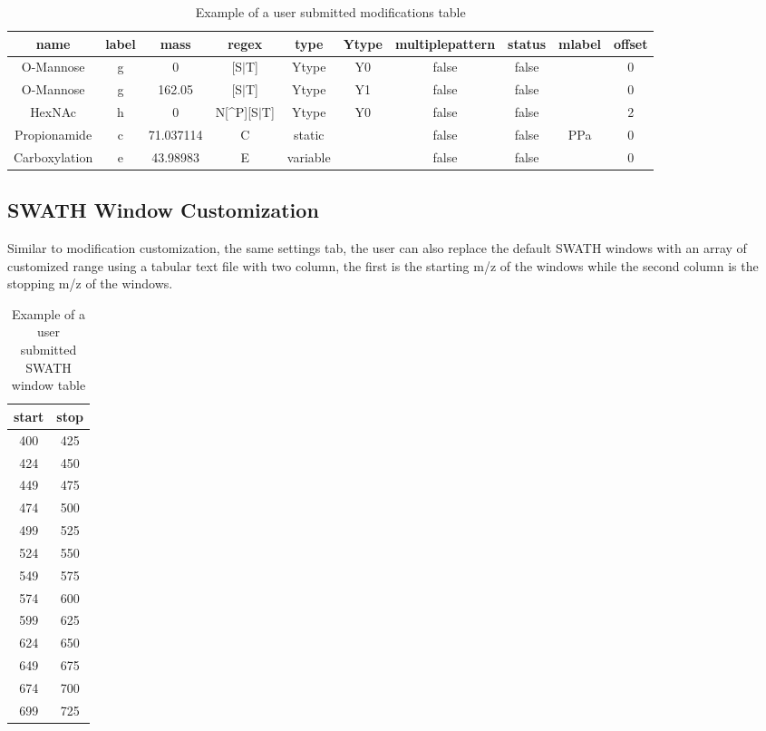 \documentclass[../manual.tex]{subfiles}
\begin{document}
\begin{table}[h]
	\caption{Example of a user submitted modifications table}
	\begin{adjustbox}{width=1\textwidth}
		\small
		\begin{tabular}{c c c c c c c c c c}
			\hline name   & label & mass      & regex           & type     & Ytype & multiplepattern & status & mlabel & offset \\ [0.1ex]
			\hline\hline
			O-Mannose     & g     & 0         & [S$|$T]         & Ytype    & Y0    & false           & false  &        & 0      \\
			O-Mannose     & g     & 162.05    & [S$|$T]         & Ytype    & Y1    & false           & false  &        & 0      \\
			HexNAc        & h     & 0         & N[\^{}P][S$|$T] & Ytype    & Y0    & false           & false  &        & 2      \\
			Propionamide  & c     & 71.037114 & C               & static   &       & false           & false  & PPa    & 0      \\
			Carboxylation & e     & 43.98983  & E               & variable &       & false           & false  &        & 0      \\
		\end{tabular}
	\end{adjustbox}
\end{table}

\subsection{SWATH Window Customization}
Similar to modification customization, the same settings tab, the user can also replace the default SWATH windows with an array of customized range using a tabular text file with two column, the first is the starting m/z of the windows while the second column is the stopping m/z of the windows.
\begin{table}[h]
	\caption{Example of a user submitted SWATH window table}
	\centering
	\begin{tabular}{c c}
		\hline start & stop \\
		\hline\hline
		400          & 425  \\
		424          & 450  \\
		449          & 475  \\
		474          & 500  \\
		499          & 525  \\
		524          & 550  \\
		549          & 575  \\
		574          & 600  \\
		599          & 625  \\
		624          & 650  \\
		649          & 675  \\
		674          & 700  \\
		699          & 725  \\
	\end{tabular}
\end{table}
\end{document}
